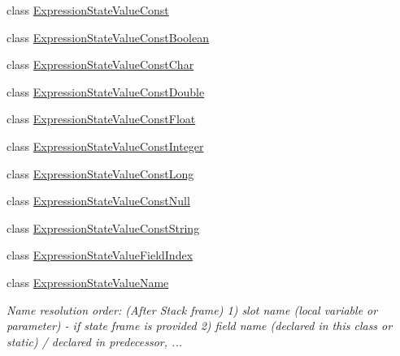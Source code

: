 \begin{DoxyCompactItemize}
class \hyperlink{classgov_1_1nasa_1_1jpf_1_1inspector_1_1server_1_1expression_1_1expressions_1_1_expression_state_value_const}{Expression\+State\+Value\+Const}
\item 
class \hyperlink{classgov_1_1nasa_1_1jpf_1_1inspector_1_1server_1_1expression_1_1expressions_1_1_expression_state_value_const_boolean}{Expression\+State\+Value\+Const\+Boolean}
\item 
class \hyperlink{classgov_1_1nasa_1_1jpf_1_1inspector_1_1server_1_1expression_1_1expressions_1_1_expression_state_value_const_char}{Expression\+State\+Value\+Const\+Char}
\item 
class \hyperlink{classgov_1_1nasa_1_1jpf_1_1inspector_1_1server_1_1expression_1_1expressions_1_1_expression_state_value_const_double}{Expression\+State\+Value\+Const\+Double}
\item 
class \hyperlink{classgov_1_1nasa_1_1jpf_1_1inspector_1_1server_1_1expression_1_1expressions_1_1_expression_state_value_const_float}{Expression\+State\+Value\+Const\+Float}
\item 
class \hyperlink{classgov_1_1nasa_1_1jpf_1_1inspector_1_1server_1_1expression_1_1expressions_1_1_expression_state_value_const_integer}{Expression\+State\+Value\+Const\+Integer}
\item 
class \hyperlink{classgov_1_1nasa_1_1jpf_1_1inspector_1_1server_1_1expression_1_1expressions_1_1_expression_state_value_const_long}{Expression\+State\+Value\+Const\+Long}
\item 
class \hyperlink{classgov_1_1nasa_1_1jpf_1_1inspector_1_1server_1_1expression_1_1expressions_1_1_expression_state_value_const_null}{Expression\+State\+Value\+Const\+Null}
\item 
class \hyperlink{classgov_1_1nasa_1_1jpf_1_1inspector_1_1server_1_1expression_1_1expressions_1_1_expression_state_value_const_string}{Expression\+State\+Value\+Const\+String}
\item 
class \hyperlink{classgov_1_1nasa_1_1jpf_1_1inspector_1_1server_1_1expression_1_1expressions_1_1_expression_state_value_field_index}{Expression\+State\+Value\+Field\+Index}
\item 
class \hyperlink{classgov_1_1nasa_1_1jpf_1_1inspector_1_1server_1_1expression_1_1expressions_1_1_expression_state_value_name}{Expression\+State\+Value\+Name}
\begin{DoxyCompactList}\small\item\em Name resolution order\+: (After Stack frame) 1) slot name (local variable or parameter) -\/ if state frame is provided 2) field name (declared in this class or static) / declared in predecessor, ... \end{DoxyCompactList}\item 

\end{DoxyCompactItemize}
